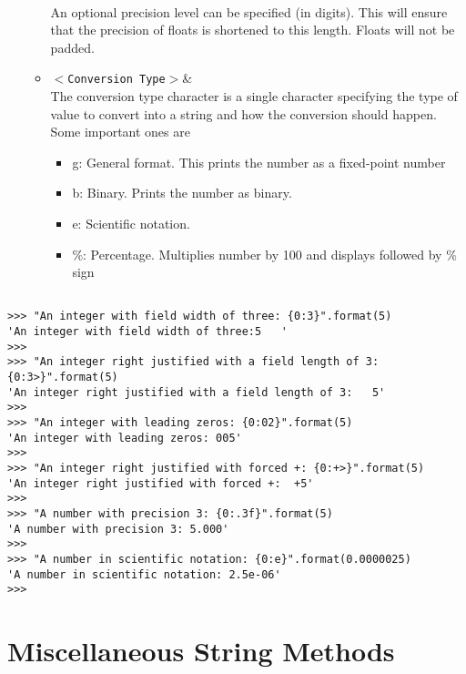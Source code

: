 \begin{enumerate}
\begin{itemize}
\\        An optional precision level can be specified (in digits). This will    ensure that the precision of floats is shortened to this length.    Floats will not be padded.
	\item 
\texttt{$<$Conversion Type$>$}&
\\         The conversion type character is a single character specifying     the type of value to convert into a string and how the     conversion should happen. Some important ones     are      
\begin{itemize}
	\item g: General format. This prints the number as a fixed-point number
	\item b: Binary. Prints the number as binary.
	\item e: Scientific notation.
	\item \%: Percentage. Multiplies number by 100 and displays followed by \% sign
\end{itemize}
\end{itemize}
\end{enumerate}
\begin{lstlisting}

>>> "An integer with field width of three: {0:3}".format(5)
'An integer with field width of three:5   '
>>>
>>> "An integer right justified with a field length of 3: {0:3>}".format(5) 
'An integer right justified with a field length of 3:   5'
>>>
>>> "An integer with leading zeros: {0:02}".format(5)
'An integer with leading zeros: 005'
>>>
>>> "An integer right justified with forced +: {0:+>}".format(5)
'An integer right justified with forced +:  +5'
>>>
>>> "A number with precision 3: {0:.3f}".format(5)
'A number with precision 3: 5.000'
>>>
>>> "A number in scientific notation: {0:e}".format(0.0000025)
'A number in scientific notation: 2.5e-06'
>>>
\end{lstlisting}

\section{Miscellaneous String Methods}

